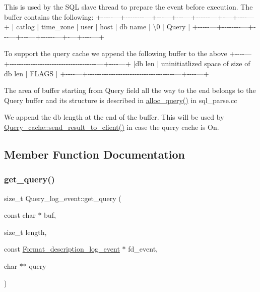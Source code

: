 This is used by the S\+QL slave thread to prepare the event before execution. The buffer contains the following\+: +-\/-\/-\/-\/-\/---+-\/-\/-\/-\/-\/-\/-\/-\/---+-\/-\/-\/---+-\/-\/-\/---+-\/-\/-\/-\/-\/-\/---+-\/---+-\/-\/-\/-\/---+ $\vert$ catlog $\vert$ time\+\_\+zone $\vert$ user $\vert$ host $\vert$ db name $\vert$ \textbackslash{}0 $\vert$ Query $\vert$ +-\/-\/-\/-\/-\/---+-\/-\/-\/-\/-\/-\/-\/-\/---+-\/-\/-\/---+-\/-\/-\/---+-\/-\/-\/-\/-\/-\/---+-\/---+-\/-\/-\/-\/---+

To support the query cache we append the following buffer to the above +-\/-\/-\/-\/---+-\/-\/-\/-\/-\/-\/-\/-\/-\/-\/-\/-\/-\/-\/-\/-\/-\/-\/-\/-\/-\/-\/-\/-\/-\/-\/-\/-\/-\/-\/-\/-\/-\/-\/-\/-\/-\/---+-\/-\/-\/-\/---+ $\vert$db len $\vert$ uninitiatlized space of size of db len $\vert$ F\+L\+A\+GS $\vert$ +-\/-\/-\/-\/---+-\/-\/-\/-\/-\/-\/-\/-\/-\/-\/-\/-\/-\/-\/-\/-\/-\/-\/-\/-\/-\/-\/-\/-\/-\/-\/-\/-\/-\/-\/-\/-\/-\/-\/-\/-\/-\/---+-\/-\/-\/-\/---+

The area of buffer starting from Query field all the way to the end belongs to the Query buffer and its structure is described in \mbox{\hyperlink{group__Runtime__Environment_ga8b3573b4adc788a4eeddbf6d1cb12582}{alloc\+\_\+query()}} in sql\+\_\+parse.\+cc

We append the db length at the end of the buffer. This will be used by \mbox{\hyperlink{classQuery__cache_a8af9f720ae6120e8eed290f6f255e5bc}{Query\+\_\+cache\+::send\+\_\+result\+\_\+to\+\_\+client()}} in case the query cache is On.

\subsection{Member Function Documentation}
\mbox{\label{classQuery__log__event_afde3125ae01398ecb57c7c14282959f4}} 
\subsubsection{\texorpdfstring{get\+\_\+query()}{get\_query()}}
{\footnotesize\ttfamily size\+\_\+t Query\+\_\+log\+\_\+event\+::get\+\_\+query (\begin{DoxyParamCaption}\item[{const char $\ast$}]{buf,  }\item[{size\+\_\+t}]{length,  }\item[{const \mbox{\hyperlink{classFormat__description__log__event}{Format\+\_\+description\+\_\+log\+\_\+event}} $\ast$}]{fd\+\_\+event,  }\item[{char $\ast$$\ast$}]{query }\end{DoxyParamCaption})\hspace{0.3cm}{\ttfamily [static]}}

